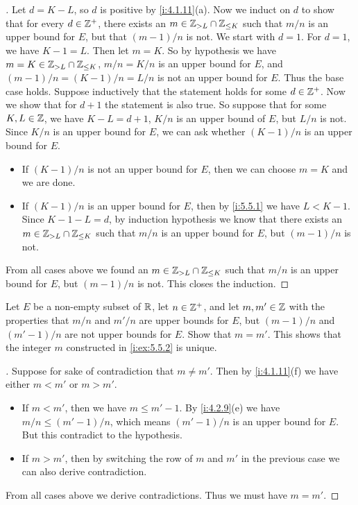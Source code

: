 \begin{proof}[]
  Let \(d = K - L\), so \(d\) is positive by \cref{i:4.1.11}(a).
  Now we induct on \(d\) to show that for every \(d \in \mathbb{Z}^+\), there exists an \(m \in \mathbb{Z}_{> L} \cap \mathbb{Z}_{\leq K}\) such that \(m / n\) is an upper bound for \(E\), but that \((m - 1) / n\) is not.
  We start with \(d = 1\).
  For \(d = 1\), we have \(K - 1 = L\).
  Then let \(m = K\).
  So by hypothesis we have \(m = K \in \mathbb{Z}_{> L} \cap \mathbb{Z}_{\leq K}\), \(m / n = K / n\) is an upper bound for \(E\), and \((m - 1) / n = (K - 1) / n = L / n\) is not an upper bound for \(E\).
  Thus the base case holds.
  Suppose inductively that the statement holds for some \(d \in \mathbb{Z}^+\).
  Now we show that for \(d + 1\) the statement is also true.
  So suppose that for some \(K, L \in \mathbb{Z}\), we have \(K - L = d + 1\), \(K / n\) is an upper bound of \(E\), but \(L / n\) is not.
  Since \(K / n\) is an upper bound for \(E\), we can ask whether \((K - 1) / n\) is an upper bound for \(E\).
  \begin{itemize}
    \item If \((K - 1) / n\) is not an upper bound for \(E\), then we can choose \(m = K\) and we are done.
    \item If \((K - 1) / n\) is an upper bound for \(E\), then by \cref{i:5.5.1} we have \(L < K - 1\).
          Since \(K - 1 - L = d\), by induction hypothesis we know that there exists an \(m \in \mathbb{Z}_{> L} \cap \mathbb{Z}_{\leq K}\) such that \(m / n\) is an upper bound for \(E\), but \((m - 1) / n\) is not.
  \end{itemize}
  From all cases above we found an \(m \in \mathbb{Z}_{> L} \cap \mathbb{Z}_{\leq K}\) such that \(m / n\) is an upper bound for \(E\), but \((m - 1) / n\) is not.
  This closes the induction.
\end{proof}

\begin{ex}\label{i:ex:5.5.3}
  Let \(E\) be a non-empty subset of \(\mathbb{R}\), let \(n \in \mathbb{Z}^+\), and let \(m, m' \in \mathbb{Z}\) with the properties that \(m / n\) and \(m' / n\) are upper bounds for \(E\), but \((m - 1) / n\) and \((m' - 1) / n\) are not upper bounds for \(E\).
  Show that \(m = m'\).
  This shows that the integer \(m\) constructed in \cref{i:ex:5.5.2} is unique.
\end{ex}

\begin{proof}[]
  Suppose for sake of contradiction that \(m \neq m'\).
  Then by \cref{i:4.1.11}(f) we have either \(m < m'\) or \(m > m'\).
  \begin{itemize}
    \item If \(m < m'\), then we have \(m \leq m' - 1\).
          By \cref{i:4.2.9}(e) we have \(m / n \leq (m' - 1) / n\), which means \((m' - 1) / n\) is an upper bound for \(E\).
          But this contradict to the hypothesis.
    \item If \(m > m'\), then by switching the row of \(m\) and \(m'\) in the previous case we can also derive contradiction.
  \end{itemize}
  From all cases above we derive contradictions.
  Thus we must have \(m = m'\).
\end{proof}

